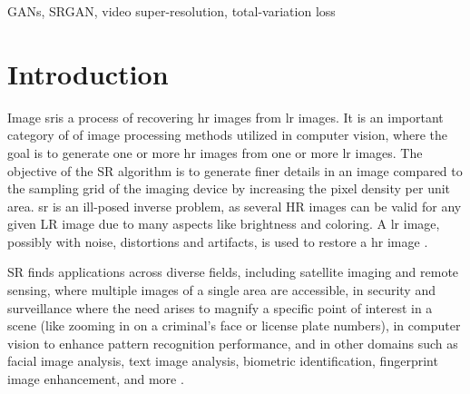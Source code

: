 \documentclass[conference]{IEEEtran}
\begin{document}
\begin{IEEEkeywords}
GANs, SRGAN, video super-resolution, total-variation loss
\end{IEEEkeywords}

\section{Introduction}
Image \acrfull{sr}is a process of recovering \acrfull{hr} images from \acrfull{lr} images. It is an important category of of image processing methods utilized in computer vision, where the goal is to generate one or more \acrshort{hr} images from one or more \acrshort{lr} images. The objective of the SR algorithm is to generate finer details in an image compared to the sampling grid of the imaging device by increasing the pixel density per unit area. \acrshort{sr} is an ill-posed inverse problem, as several HR images can be valid for any given LR image due to many aspects like brightness and coloring. A \acrshort{lr} image, possibly with noise, distortions and artifacts, is used to restore a \acrshort{hr} image \cite{Hitchhiker_guide_super_res_2023, sr_ill_posed_2021}.

SR finds applications across diverse fields, including satellite imaging and remote sensing, where multiple images of a single area are accessible, in security and surveillance where the need arises to magnify a specific point of interest in a scene (like zooming in on a criminal's face or license plate numbers), in computer vision to enhance pattern recognition performance, and in other domains such as facial image analysis, text image analysis, biometric identification, fingerprint image enhancement, and more \cite{sr_technical_overview_2003}.

\end{document}

